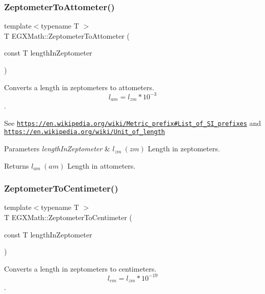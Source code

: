 \subsubsection{\texorpdfstring{Zeptometer\+To\+Attometer()}{ZeptometerToAttometer()}}
{\footnotesize\ttfamily template$<$typename T $>$ \\
T E\+G\+X\+Math\+::\+Zeptometer\+To\+Attometer (\begin{DoxyParamCaption}\item[{const T}]{length\+In\+Zeptometer }\end{DoxyParamCaption})}



Converts a length in zeptometers to attometers. \[ l_{am}=l_{zm} * 10^{-3} \]. 

See \href{https://en.wikipedia.org/wiki/Metric_prefix#List_of_SI_prefixes}{\tt https\+://en.\+wikipedia.\+org/wiki/\+Metric\+\_\+prefix\#\+List\+\_\+of\+\_\+\+S\+I\+\_\+prefixes} and \href{https://en.wikipedia.org/wiki/Unit_of_length}{\tt https\+://en.\+wikipedia.\+org/wiki/\+Unit\+\_\+of\+\_\+length} 
\begin{DoxyParams}{Parameters}
{\em length\+In\+Zeptometer} & $ l_{zm}\ (zm)$ Length in zeptometers. \\
\hline
\end{DoxyParams}
\begin{DoxyReturn}{Returns}
$ l_{am}\ (am)$ Length in attometers. 
\end{DoxyReturn}
\mbox{\label{group___e_g_x_math-_conversions-_length_conversions-_zeptometer-_s_i_ga11d9546ba555e2fca128d6c905fed139}} 
\subsubsection{\texorpdfstring{Zeptometer\+To\+Centimeter()}{ZeptometerToCentimeter()}}
{\footnotesize\ttfamily template$<$typename T $>$ \\
T E\+G\+X\+Math\+::\+Zeptometer\+To\+Centimeter (\begin{DoxyParamCaption}\item[{const T}]{length\+In\+Zeptometer }\end{DoxyParamCaption})}



Converts a length in zeptometers to centimeters. \[ l_{cm}=l_{zm} * 10^{-19} \]. 

